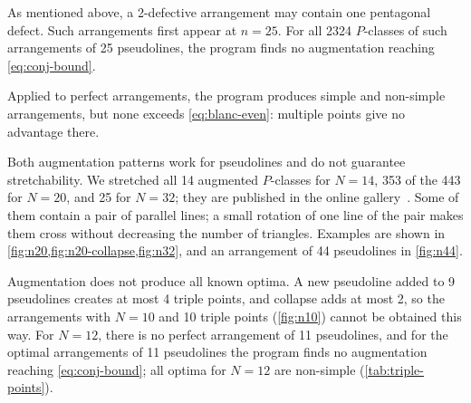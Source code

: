 As mentioned above, a 2-defective arrangement may contain one pentagonal defect. Such arrangements first appear at $n=25$. For all 2324 $P$-classes of such arrangements of 25 pseudolines, the program finds no augmentation reaching \eqref{eq:conj-bound}.

Applied to perfect arrangements, the program produces simple and non-simple arrangements, but none exceeds \eqref{eq:blanc-even}: multiple points give no advantage there.

Both augmentation patterns work for pseudolines and do not guarantee stretchability.
We stretched all 14 augmented $P$-classes for $N=14$, 353 of the 443 for $N=20$, and 25 for $N=32$; they are published in the online gallery~\cite{gallery}.
Some of them contain a pair of parallel lines; a small rotation of one line of the pair  makes them cross without decreasing the number of triangles.
Examples are shown in \cref{fig:n20,fig:n20-collapse,fig:n32}, and an arrangement of 44 pseudolines in \cref{fig:n44}.

Augmentation does not produce all known optima. A new pseudoline added to 9 pseudolines creates at most 4 triple points, and collapse adds at most 2, so the arrangements with $N=10$ and 10 triple points (\cref{fig:n10}) cannot be obtained this way. For $N=12$, there is no perfect arrangement of 11 pseudolines, and for the optimal arrangements of 11 pseudolines the program finds no augmentation reaching \eqref{eq:conj-bound}; all optima for $N=12$ are non-simple (\cref{tab:triple-points}).
